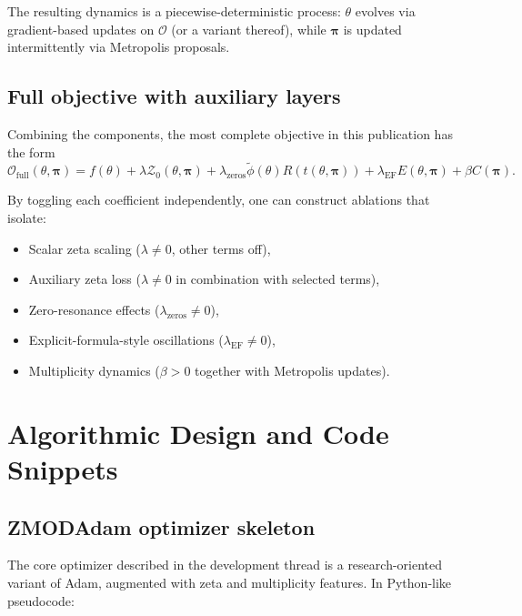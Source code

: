 \documentclass[11pt]{article}
\begin{document}
The resulting dynamics is a piecewise-deterministic process: $\theta$ evolves via gradient-based updates on $\mathcal{O}$ (or a variant thereof), while $\bm{\pi}$ is updated intermittently via Metropolis proposals.

\subsection{Full objective with auxiliary layers}

Combining the components, the most complete objective in this publication has the form
\begin{equation}
  \mathcal{O}_{\mathrm{full}}(\theta,\bm{\pi})
   = f(\theta) + \lambda \mathcal{Z}_0(\theta,\bm{\pi})
     + \lambda_{\mathrm{zeros}} \tilde{\phi}(\theta) R(t(\theta,\bm{\pi}))
     + \lambda_{\mathrm{EF}} E(\theta,\bm{\pi})
     + \beta C(\bm{\pi}).
  \label{eq:full_objective}
\end{equation}

By toggling each coefficient independently, one can construct ablations that isolate:
\begin{itemize}[leftmargin=*]
  \item Scalar zeta scaling ($\lambda\neq 0$, other terms off),
  \item Auxiliary zeta loss ($\lambda\neq 0$ in combination with selected terms),
  \item Zero-resonance effects ($\lambda_{\mathrm{zeros}}\neq 0$),
  \item Explicit-formula-style oscillations ($\lambda_{\mathrm{EF}}\neq 0$),
  \item Multiplicity dynamics ($\beta>0$ together with Metropolis updates).
\end{itemize}

\section{Algorithmic Design and Code Snippets}

\subsection{ZMODAdam optimizer skeleton}

The core optimizer described in the development thread is a research-oriented variant of Adam, augmented with zeta and multiplicity features. In Python-like pseudocode:
\end{document}
